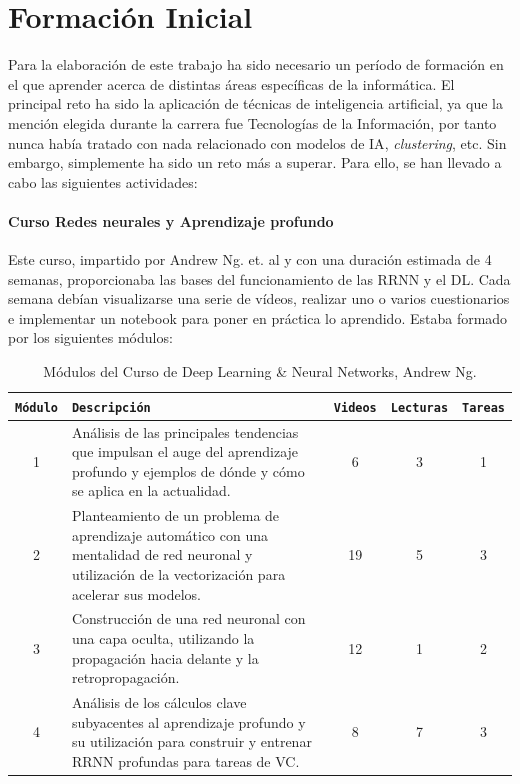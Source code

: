 \chapter{Formación Inicial} \label{formacion}


Para la elaboración de este trabajo ha sido necesario un período de formación en el que aprender acerca de distintas áreas específicas de la informática. El principal reto ha sido la aplicación de técnicas de inteligencia artificial, ya que la mención elegida durante la carrera fue Tecnologías de la Información, por tanto nunca había tratado con nada relacionado con modelos de \gls{IA}, \textit{clustering}, etc. Sin embargo, simplemente ha sido un reto más a superar. Para ello, se han llevado a cabo las siguientes actividades:

\subsubsection*{Curso Redes neurales y Aprendizaje profundo}

Este curso, impartido por Andrew Ng. et. al \cite{ng2023deep} y con una duración estimada de 4 semanas, proporcionaba las bases del funcionamiento de las \gls{RRNN} y el \gls{DL}. Cada semana debían visualizarse una serie de vídeos, realizar uno o varios cuestionarios e implementar un notebook para poner en práctica lo aprendido. Estaba formado por los siguientes módulos:

\begin{table}[H]
\centering
\footnotesize
\label{tab:course_modules}
\begin{tabularx}{\textwidth}{|c|X|c|c|c|}
\hline
\rowcolor{graylight}\texttt{Módulo} & \texttt{Descripción} & \texttt{Videos} & \texttt{Lecturas} & \texttt{Tareas} \\
\hline
1 & Análisis de las principales tendencias que impulsan el auge del aprendizaje profundo y ejemplos de dónde y cómo se aplica en la actualidad. & 6 & 3 & 1 \\
\hline
2 & Planteamiento de un problema de aprendizaje automático con una mentalidad de red neuronal y utilización de la vectorización para acelerar sus modelos. & 19 & 5 & 3 \\
\hline
3 & Construcción de una red neuronal con una capa oculta, utilizando la propagación hacia delante y la retropropagación. & 12 & 1 & 2 \\
\hline
4 & Análisis de los cálculos clave subyacentes al aprendizaje profundo y su utilización para construir y entrenar \gls{RRNN} profundas para tareas de \gls{VC}. & 8 & 7 & 3 \\
\hline
\end{tabularx}
\caption{Módulos del Curso de Deep Learning \& Neural Networks, Andrew Ng. \cite{ng2023deep}}
\end{table}

